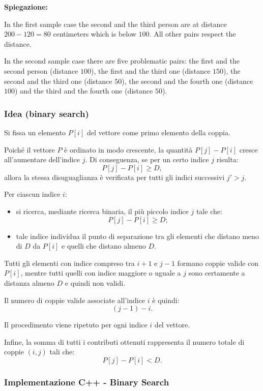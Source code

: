 \noindent\textbf{Spiegazione:} 

In the first sample case the second and the third person are at distance $200-120 = 80$ centimeters which is below $100$. All other pairs respect the distance.

\bigskip
In the second sample case there are five problematic pairs: the first and the second person (distance $100$), the first and the third one (distance $150$), the second and the third one (distance $50$), the second
and the fourth one (distance $100$) and the third and the fourth one (distance $50$).


\subsubsection*{Idea (binary search)}

Si fissa un elemento $P[i]$ del vettore come primo elemento della coppia.

Poiché il vettore $P$ è ordinato in modo crescente, la quantità $P[j] - P[i]$ cresce all’aumentare dell’indice $j$.
Di conseguenza, se per un certo indice $j$ risulta:
\[
P[j] - P[i] \ge D,
\]
allora la stessa disuguaglianza è verificata per tutti gli indici successivi $j' > j$.

Per ciascun indice $i$:
\begin{itemize}
	\item si ricerca, mediante ricerca binaria, il più piccolo indice $j$ tale che:
	\[
	P[j] - P[i] \ge D;
	\]
	\item tale indice individua il punto di separazione tra gli elementi che distano meno di $D$ da $P[i]$ e quelli che distano almeno $D$.
\end{itemize}

Tutti gli elementi con indice compreso tra $i+1$ e $j-1$ formano coppie valide con $P[i]$, mentre tutti quelli con indice maggiore o uguale a $j$ sono certamente a distanza almeno $D$ e quindi non validi.

Il numero di coppie valide associate all’indice $i$ è quindi:
\[
(j - 1) - i.
\]

Il procedimento viene ripetuto per ogni indice $i$ del vettore.

Infine, la somma di tutti i contributi ottenuti rappresenta il numero totale di coppie $(i,j)$ tali che:
\[
P[j] - P[i] < D.
\]


\subsubsection*{Implementazione C++ - Binary Search}



